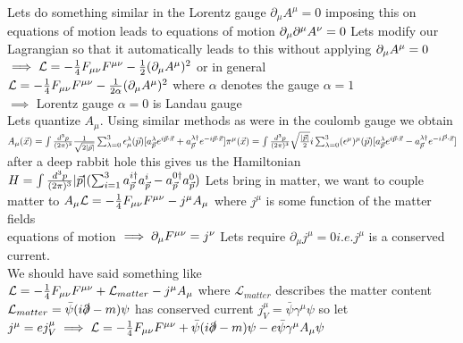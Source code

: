 \documentclass[12pt]{amsart}
\begin{document}
\begin{enumerate}
Lets do something similar in the Lorentz gauge $\partial_{\mu}A^{\mu} = 0$ imposing this on equations of motion leads to equations of motion $\partial_{\mu} \partial^{\mu} A^{\nu} = 0\\$
Lets modify our Lagrangian so that it automatically leads to this without applying $\partial_{\mu} A^{\mu} = 0 \\$
$\implies \mathcal{L} = -\frac{1}{4} F_{\mu \nu} F^{\mu \nu} - \frac{1}{2} ( \partial_{\mu} A^{\mu})^2\\$
or in general\\
$\mathcal{L} = - \frac{1}{4} F_{\mu \nu} F^{\mu \nu} - \frac{1}{2 \alpha}(\partial_{\mu} A^{\mu})^2\\$
where $\alpha$ denotes the gauge $\alpha = 1$\\ 
$\implies$ Lorentz gauge $\alpha = 0$ is Landau gauge\\
Lets quantize $A_{\mu}$. Using similar methods as were in the coulomb gauge we obtain\\
$A_{\mu}(\vec{x}) = \int \frac{d^3 p}{(2 \pi)^3} \frac{1}{\sqrt{2 | \vec{p} |}} \sum_{\lambda=0}^3 \epsilon_{\mu}^{\lambda} ( \vec{p}) [ a_{\vec{p}}^{\lambda} e^{i \vec{p} \cdot \vec{x}} + a_{\vec{p}}^{\lambda \dagger} e^{- i \vec{p} \cdot \vec{x}}]\\
\pi^{\mu} (\vec{x}) = \int \frac{d^3 p}{(2 \pi)^3} \sqrt{\frac{|\vec{p}|}{2}} i \sum_{\lambda = 0}^3 (\epsilon^{\mu})^{\mu}(\vec{p})[a_{\vec{p}}^{\lambda} e^{i \vec{p} \cdot \vec{x}} - a_{\vec{p}}^{\lambda \dagger} e^{-i \vec{P} \cdot \vec{x}}]\\$
after a deep rabbit hole this gives us the Hamiltonian\\
$H=\int \frac{d^3 p}{(2 \pi)^3} |\vec{p}|(\sum_{i=1}^3 a_{\vec{p}}^{i \dagger} a_{\vec{p}}^i - a_{\vec{p}}^{0 \dagger} a_{\vec{p}}^0)\\$
Lets bring in matter, we want to couple matter to $A_{\mu}\\
\mathcal{L} = -\frac{1}{4} F_{\mu \nu} F^{\mu \nu} - j^{\mu} A_{\mu}\\$
where $j^{\mu}$ is some function of the matter fields\\
equations of motion $\implies \partial_{\mu}F^{\mu \nu} = j^{\nu}\\$
Lets require $\partial_{\mu} j^{\mu} = 0 i.e. j^{\mu}$ is a conserved current.\\
We should have said something like\\
$\mathcal{L} = -\frac{1}{4} F_{\mu \nu} F^{\mu \nu} + \mathcal{L}_{matter} - j^{\mu} A_{\mu}\\$
where $\mathcal{L}_{matter}$ describes the matter content $\mathcal{L}_{matter} = \bar{\psi}(i \slashed{\partial} -m) \psi$ has conserved current $j^{\mu}_V = \bar{\psi} \gamma^{\mu} \psi$ so let $j^{\mu} = e j^{\mu}_V\\
\implies \mathcal{L} = - \frac{1}{4} F_{\mu \nu} F^{\mu \nu} + \bar{\psi}(i \slashed{\partial } - m) \psi - e \bar{\psi} \gamma^{\mu} A_{\mu} \psi\\$



\end{enumerate}
\end{document}
